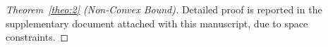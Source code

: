 \documentclass[lettersize,journal]{IEEEtran}
\newtheorem{proof}{Proof}
\begin{document}
\begin{proof}[Theorem~\ref{theo:2} (Non-Convex Bound)]
Detailed proof is reported in the supplementary document attached with this manuscript, due to space constraints.



\end{proof}
\end{document}
